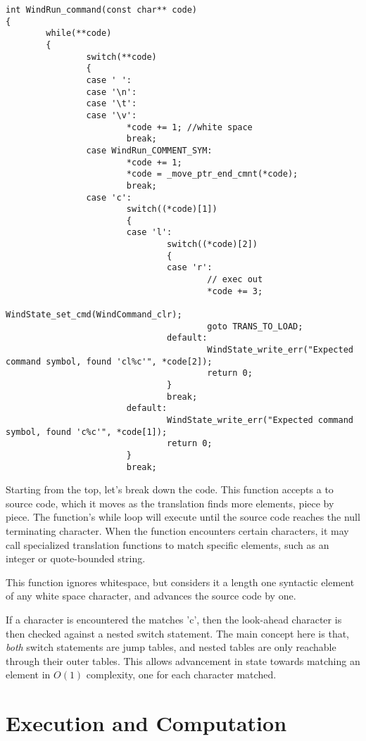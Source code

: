 \begin{lstlisting}[style=numc]
int WindRun_command(const char** code)
{
        while(**code)
        {
                switch(**code)
                {
                case ' ':
                case '\n':
                case '\t':
                case '\v':
                        *code += 1; //white space
                        break;
                case WindRun_COMMENT_SYM:
                        *code += 1;
                        *code = _move_ptr_end_cmnt(*code);
                        break;
                case 'c':
                        switch((*code)[1])
                        {
                        case 'l':
                                switch((*code)[2])
                                {
                                case 'r':
                                        // exec out
                                        *code += 3;
                                        WindState_set_cmd(WindCommand_clr);
                                        goto TRANS_TO_LOAD;
                                default:
                                        WindState_write_err("Expected command symbol, found 'cl%c'", *code[2]);
                                        return 0;
                                }
                                break;
                        default:
                                WindState_write_err("Expected command symbol, found 'c%c'", *code[1]);
                                return 0;
                        }
                        break;
\end{lstlisting}

\par Starting from the top, let's break down the code. This function accepts a  to source code, which it moves as the translation finds more elements, piece by piece. The function's while loop will execute until the source code reaches the null terminating character. When the function encounters certain characters, it may call specialized translation functions to match specific elements, such as an integer or quote-bounded string. 
\par This function ignores whitespace, but considers it a length one syntactic element of any white space character, and advances the source code by one.
\par If a character is encountered the matches 'c', then  the look-ahead character is then checked against a nested switch statement. The main concept here is that, \emph{both} switch statements are jump tables, and nested tables are only reachable through their outer tables. This allows advancement in state towards matching an element in $O(1)$ complexity, one for each character matched.

\section{Execution and Computation}